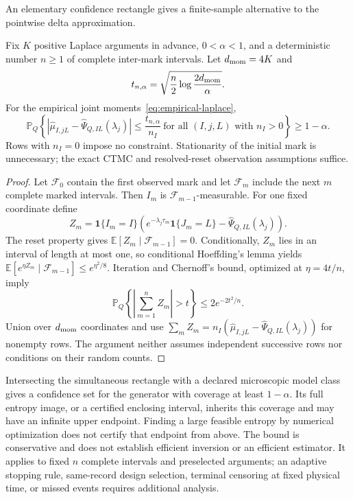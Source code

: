 An elementary confidence rectangle gives a finite-sample alternative to
the pointwise delta approximation.
\begin{proposition}
\label{prop:moment-rectangle}
Fix $K$ positive Laplace arguments in advance, $0<\alpha<1$, and a deterministic
number $n\ge1$ of complete inter-mark intervals. Let $d_{\rm mom}=4K$ and
\begin{equation}
 t_{n,\alpha}=\sqrt{\frac n2\log\frac{2d_{\rm mom}}\alpha}.
\end{equation}
For the empirical joint moments~\eqref{eq:empirical-laplace},
\begin{equation}
 \mathbb P_Q\left\{
 \left|\widehat\mu_{I,jL}-\widehat\Psi_{Q,IL}(\lambda_j)\right|
 \le\frac{t_{n,\alpha}}{n_I}
 \ \text{for all }(I,j,L)\text{ with }n_I>0\right\}\ge1-\alpha.
 \label{eq:finite-moment-rectangle}
\end{equation}
Rows with $n_I=0$ impose no constraint. Stationarity of the initial mark is
unnecessary; the exact CTMC and resolved-reset observation assumptions suffice.
\end{proposition}
\begin{proof}
Let $\mathcal F_0$ contain the first observed mark and let $\mathcal F_m$
include the next $m$ complete marked intervals. Then $I_m$ is
$\mathcal F_{m-1}$-measurable. For one fixed coordinate define
\begin{equation}
 Z_m=\mathbf1\{I_m=I\}
 \left(e^{-\lambda_j\tau_m}\mathbf1\{J_m=L\}
       -\widehat\Psi_{Q,IL}(\lambda_j)\right).
\end{equation}
The reset property gives $\mathbb E[Z_m\mid\mathcal F_{m-1}]=0$.
Conditionally, $Z_m$ lies in an interval of length at most one, so
conditional Hoeffding's lemma yields
$\mathbb E[e^{\eta Z_m}\mid\mathcal F_{m-1}]\le e^{\eta^2/8}$.
Iteration and Chernoff's bound, optimized at $\eta=4t/n$, imply
\begin{equation}
 \mathbb P_Q\left\{\left|\sum_{m=1}^nZ_m\right|>t\right\}
 \le2e^{-2t^2/n}.
\end{equation}
Union over $d_{\rm mom}$ coordinates and use
$\sum_mZ_m=n_I(\widehat\mu_{I,jL}-\widehat\Psi_{Q,IL}(\lambda_j))$
for nonempty rows. The argument neither assumes independent successive rows
nor conditions on their random counts.
\end{proof}

Intersecting the simultaneous rectangle with a declared microscopic model
class gives a confidence set for the generator with coverage at least
$1-\alpha$. Its full entropy image, or a certified enclosing interval,
inherits this coverage and may have an infinite upper endpoint. Finding a
large feasible entropy by numerical optimization does not certify that
endpoint from above. The bound is conservative and does not establish
efficient inversion or an efficient estimator. It applies to fixed $n$
complete intervals and preselected arguments; an adaptive stopping rule,
same-record design selection, terminal censoring at fixed physical time,
or missed events requires additional analysis.

